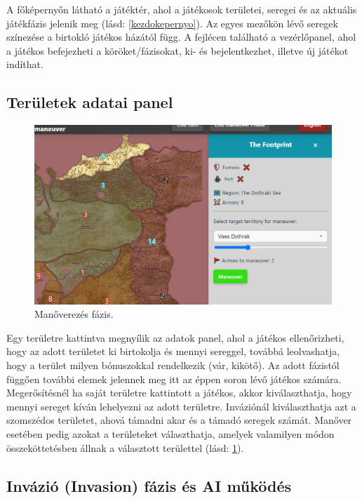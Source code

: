 \documentclass[
]{thesis-ekf}
\theoremstyle{definition}
\theoremstyle{remark}
\begin{document}
	A főképernyőn látható a játéktér, ahol a játékosok területei, seregei és az aktuális játékfázis jelenik meg (lásd: \ref{kezdokepernyo}). Az egyes mezőkön lévő seregek színezése a birtokló játékos házától függ. A fejlécen található a vezérlőpanel, ahol a játékos befejezheti a köröket/fázisokat, ki- és bejelentkezhet, illetve új játékot indíthat.
	
	\subsection*{Területek adatai panel}
	
	\begin{figure}[ht!]
		\centering
		\includegraphics[width=16cm]{manover.png}
		\caption{Manőverezés fázis.}
		\label{manover}
	\end{figure}
	
	Egy területre kattintva megnyílik az adatok panel, ahol a játékos ellenőrizheti, hogy az adott területet ki birtokolja és mennyi sereggel, továbbá leolvashatja, hogy a terület milyen bónuszokkal rendelkezik (vár, kikötő). Az adott fázistól függően további elemek jelennek meg itt az éppen soron lévő játékos számára. Megerősítésnél ha saját területre kattintott a játékos, akkor kiválaszthatja, hogy mennyi sereget kíván lehelyezni az adott területre. Inváziónál kiválaszthatja azt a szomszédos területet, ahová támadni akar és a támadó seregek számát. Manőver esetében pedig azokat a területeket választhatja, amelyek valamilyen módon összeköttetésben állnak a választott területtel (lásd: \ref{manover}).
	
	\subsection*{Invázió (Invasion) fázis és AI működés}
	
\end{document}
